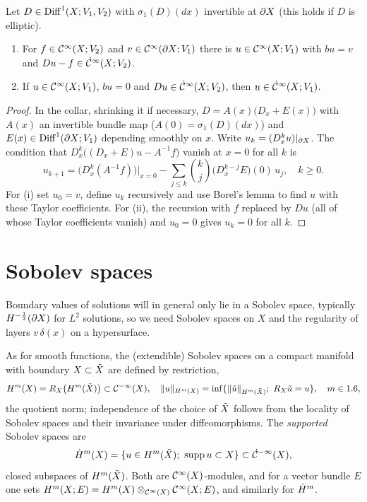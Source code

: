 \begin{lemma}\label{boundary:lem:formal}
Let $D\in\operatorname{Diff}^{1}(X;V_1,V_2)$ with $\sigma_1(D)(dx)$ invertible at $\partial X$ (this holds
if $D$ is elliptic).
\begin{enumerate}[label=(\roman*)]
\item For $f\in\mathcal{C}^\infty(X;V_2)$ and $v\in\mathcal{C}^\infty(\partial X;V_1)$ there is $u\in\mathcal{C}^\infty(X;V_1)$ with
$bu=v$ and $Du-f\in\dot{\mathcal{C}}^\infty(X;V_2)$.
\item If $u\in\mathcal{C}^\infty(X;V_1)$, $bu=0$ and $Du\in\dot{\mathcal{C}}^\infty(X;V_2)$, then $u\in\dot{\mathcal{C}}^\infty(X;V_1)$.
\end{enumerate}
\end{lemma}
\begin{proof}
In the collar, shrinking it if necessary, $D=A(x)\big(D_x+E(x)\big)$ with $A(x)$ an
invertible bundle map ($A(0)=\sigma_1(D)(dx)$) and $E(x)\in\operatorname{Diff}^{1}(\partial X;V_1)$
depending smoothly on $x$. Write $u_k=(D_x^ku)|_{\partial X}$. The condition that
$D_x^k\big((D_x+E)u-A^{-1}f\big)$ vanish at $x=0$ for all $k$ is
\begin{equation*}
u_{k+1}=\big(D_x^k(A^{-1}f)\big)|_{x=0}-\sum_{j\le k}\binom kj\big(D_x^{k-j}E\big)(0)\,u_j,
\quad k\ge0.
\end{equation*}
For (i) set $u_0=v$, define $u_k$ recursively and use Borel's lemma to find $u$ with
these Taylor coefficients. For (ii), the recursion with $f$ replaced by $Du$ (all of
whose Taylor coefficients vanish) and $u_0=0$ gives $u_k=0$ for all $k$.
\end{proof}

\section{Sobolev spaces}\label{boundary:sec:sobolev}

Boundary values of solutions will in general only lie in a Sobolev space, typically
$H^{-\frac12}(\partial X)$ for $L^2$ solutions, so we need Sobolev spaces on $X$ and the
regularity of layers $v\,\delta(x)$ on a hypersurface.

As for smooth functions, the (extendible) Sobolev spaces on a compact manifold with
boundary $X\subset\tilde{X}$ are defined by restriction,
\begin{equation*}
H^m(X)=R_X\big(H^m(\tilde{X})\big)\subset\mathcal{C}^{-\infty}(X),\quad \lVert u\rVert_{H^m(X)}=\inf\{\lVert \tilde
u\rVert_{H^m(\tilde{X})};\ R_X\tilde u=u\},\quad m\in1.6,
\end{equation*}
the quotient norm; independence of the choice of $\tilde{X}$ follows from the locality of
Sobolev spaces and their invariance under diffeomorphisms. The \emph{supported}
Sobolev spaces are
\begin{equation*}
\dot{H}^{m}(X)=\{u\in H^m(\tilde{X});\ \operatorname{supp} u\subset X\}\subset\dot{\mathcal{C}}^{-\infty}(X),
\end{equation*}
closed subspaces of $H^m(\tilde{X})$. Both are $\mathcal{C}^\infty(X)$-modules, and for a vector bundle $E$
one sets $H^m(X;E)=H^m(X)\otimes_{\mathcal{C}^\infty(X)}\mathcal{C}^\infty(X;E)$, and similarly for $\dot{H}^{m}$.

